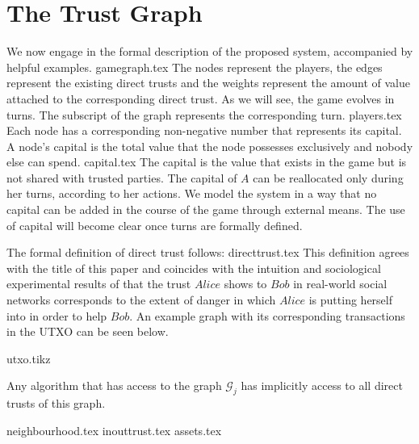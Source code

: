 \section{The Trust Graph}
  We now engage in the formal description of the proposed system, accompanied by helpful examples.
  {gamegraph.tex}
  \noindent The nodes represent the players, the edges represent the existing direct trusts and the weights represent the
  amount of value attached to the corresponding direct trust. As we will see, the game evolves in turns. The subscript of the
  graph represents the corresponding turn.
  {players.tex}
  \noindent Each node has a corresponding non-negative number that represents its capital. A node's capital is the total value
  that the node possesses exclusively and nobody else can spend.
  {capital.tex}
  \noindent The capital is the value that exists in the game but is not shared with trusted parties. The capital of $A$ can be
  reallocated only during her turns, according to her actions. We model the system in a way that no capital can be added in
  the course of the game through external means. The use of capital will become clear once turns are formally defined.

  The formal definition of direct trust follows:
  {directtrust.tex}
  \noindent This definition agrees with the title of this paper and coincides with the intuition and sociological experimental
  results of \cite{kmrs} that the trust $Alice$ shows to $Bob$ in real-world social networks corresponds to the extent of
  danger in which $Alice$ is putting herself into in order to help $Bob$. An example graph with its corresponding transactions
  in the UTXO can be seen below.

  {utxo.tikz}

  \noindent Any algorithm that has access to the graph $\mathcal{G}_j$ has implicitly access to all direct trusts of this
  graph.

  {neighbourhood.tex}
  {inouttrust.tex}
  \ifdefined\proceedings
  \else
    {assets.tex}
  \fi

